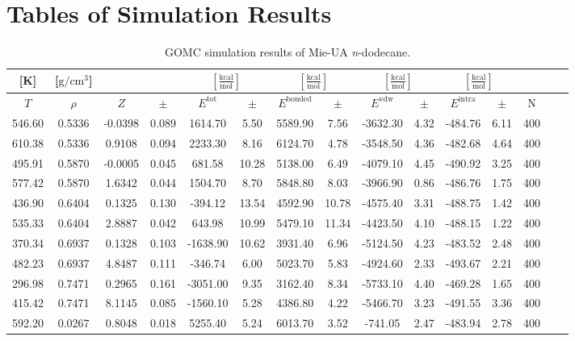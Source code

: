 \documentclass[%
 aip,
 jcp,
 sd,%
 amsmath,amssymb,
]{revtex4-1}
\begin{document}
\section{Tables of Simulation Results}
\begin{table*}[!htbp]
\centering
\caption{GOMC simulation results of Mie-UA \textit{n}-dodecane.}
\label{tab:NIST-VAL-C12-FTT}
\begin{ruledtabular}
\begin{tabular}{ccccccccccccccc}
[K] & [$\mathrm{g/cm^3}$] &  &  & \multicolumn{2}{c}{$[\frac{\mathrm{kcal}}{\mathrm{mol}}]$} & \multicolumn{2}{c}{$[\frac{\mathrm{kcal}}{\mathrm{mol}}]$} & \multicolumn{2}{c}{$[\frac{\mathrm{kcal}}{\mathrm{mol}}]$} &\multicolumn{2}{c}{$[\frac{\mathrm{kcal}}{\mathrm{mol}}]$} & \\
\hline
$T$ & $\rho$ & $Z$ & $\pm$ & $E^{\mathrm{tot}}$ & $\pm$ & $E^{\mathrm{bonded}}$ & $\pm$ & $E^{\mathrm{vdw}}$ & $\pm$ & $E^{\mathrm{intra}}$ & $\pm$ & N\\
\hline
546.60	&	0.5336	&	-0.0398	&	0.089	&	1614.70	&	5.50	&	5589.90	&	7.56	&	-3632.30	&	4.32	&	-484.76	&	6.11	&	400	\\
610.38	&	0.5336	&	0.9108	&	0.094	&	2233.30	&	8.16	&	6124.70	&	4.78	&	-3548.50	&	4.36	&	-482.68	&	4.64	&	400	\\
495.91	&	0.5870	&	-0.0005	&	0.045	&	681.58	&	10.28	&	5138.00	&	6.49	&	-4079.10	&	4.45	&	-490.92	&	3.25	&	400	\\
577.42	&	0.5870	&	1.6342	&	0.044	&	1504.70	&	8.70	&	5848.80	&	8.03	&	-3966.90	&	0.86	&	-486.76	&	1.75	&	400	\\
436.90	&	0.6404	&	0.1325	&	0.130	&	-394.12	&	13.54	&	4592.90	&	10.78	&	-4575.40	&	3.31	&	-488.75	&	1.42	&	400	\\
535.33	&	0.6404	&	2.8887	&	0.042	&	643.98	&	10.99	&	5479.10	&	11.34	&	-4423.50	&	4.10	&	-488.15	&	1.22	&	400	\\
370.34	&	0.6937	&	0.1328	&	0.103	&	-1638.90	&	10.62	&	3931.40	&	6.96	&	-5124.50	&	4.23	&	-483.52	&	2.48	&	400	\\
482.23	&	0.6937	&	4.8487	&	0.111	&	-346.74	&	6.00	&	5023.70	&	5.83	&	-4924.60	&	2.33	&	-493.67	&	2.21	&	400	\\
296.98	&	0.7471	&	0.2965	&	0.161	&	-3051.00	&	9.35	&	3162.40	&	8.34	&	-5733.10	&	4.40	&	-469.28	&	1.65	&	400	\\
415.42	&	0.7471	&	8.1145	&	0.085	&	-1560.10	&	5.28	&	4386.80	&	4.22	&	-5466.70	&	3.23	&	-491.55	&	3.36	&	400	\\
592.20	&	0.0267	&	0.8048	&	0.018	&	5255.40	&	5.24	&	6013.70	&	3.52	&	-741.05	&	2.47	&	-483.94	&	2.78	&	400	\\

\end{tabular}
\end{ruledtabular}
\end{table*}
\end{document}
